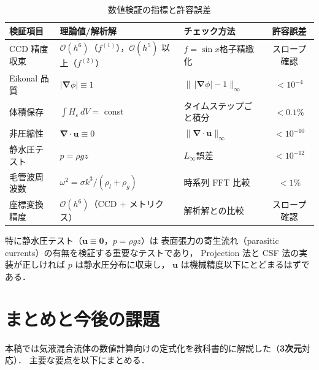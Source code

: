 \documentclass[12pt, a4paper, titlepage]{article}
\newcommand{\jp}[1]{{\normalfont\jpfont #1}}
\newcommand{\bu}{\bm{u}}
\newcommand{\bnabla}{\bm{\nabla}}
\newcommand{\He}{H_\varepsilon}
\newcommand{\Ord}[1]{\mathcal{O}(#1)}
\newcommand{\fp}[1]{f^{(1)}_{#1}}
\newcommand{\fpp}[1]{f^{(2)}_{#1}}
\begin{document}
\begin{table}[h]
\centering
\caption{\jp{数値検証の指標と許容誤差}}
\label{tab:verification}
\begin{tabular}{p{35mm}p{40mm}p{35mm}c}
\toprule
\jp{検証項目} & \jp{理論値/解析解} & \jp{チェック方法} & \jp{許容誤差}\\
\midrule
\jp{CCD 精度収束} & $\Ord{h^6}$\jp{（$\fp{}$），$\Ord{h^5}$ 以上（$\fpp{}$）} & $f=\sin x$\jp{格子精緻化} & \jp{スロープ確認}\\[3pt]
\jp{Eikonal 品質} & $|\bnabla\phi| \equiv 1$ & $\|\,|\bnabla\phi|-1\|_\infty$ & $< 10^{-4}$\\[3pt]
\jp{体積保存} & $\int\He\,dV = $ const & \jp{タイムステップごと積分} & $< 0.1\%$\\[3pt]
\jp{非圧縮性} & $\bnabla\cdot\bu \equiv 0$ & $\|\bnabla\cdot\bu\|_\infty$ & $< 10^{-10}$\\[3pt]
\jp{静水圧テスト} & $p = \rho g z$ & $L_\infty$\jp{誤差} & $< 10^{-12}$\\[3pt]
\jp{毛管波周波数} & $\omega^2 = \sigma k^3/(\rho_l+\rho_g)$ & \jp{時系列 FFT 比較} & $< 1\%$\\[3pt]
\jp{座標変換精度} & $\Ord{h^6}$\jp{（CCD + メトリクス）} & \jp{解析解との比較} & \jp{スロープ確認}\\
\bottomrule
\end{tabular}
\end{table}

\jp{特に静水圧テスト（$\bu\equiv\bm{0}$，$p=\rho g z$）は
表面張力の寄生流れ（parasitic currents）の有無を検証する重要なテストであり，
Projection 法と CSF 法の実装が正しければ $p$ は静水圧分布に収束し，
$\bu$ は機械精度以下にとどまるはずである．}


\section{\jp{まとめと今後の課題}}
\label{sec:conclusion}

\jp{本稿では気液混合流体の数値計算向けの定式化を教科書的に解説した（\textbf{3次元}対応）．
主要な要点を以下にまとめる．}
\end{document}
